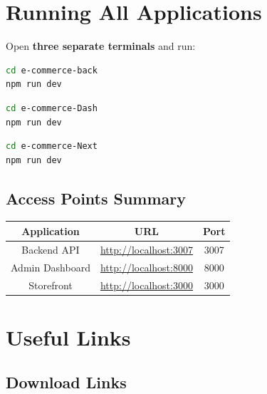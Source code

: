 \documentclass[12pt,a4paper]{article}
\begin{document}
\section{Running All Applications}

Open \textbf{three separate terminals} and run:

\begin{lstlisting}[language=bash, caption=Terminal 1 - Backend]
cd e-commerce-back
npm run dev
\end{lstlisting}

\begin{lstlisting}[language=bash, caption=Terminal 2 - Dashboard]
cd e-commerce-Dash
npm run dev
\end{lstlisting}

\begin{lstlisting}[language=bash, caption=Terminal 3 - Storefront]
cd e-commerce-Next
npm run dev
\end{lstlisting}

\subsection{Access Points Summary}

\begin{center}
\begin{tabular}{|c|c|c|}
\hline
\textbf{Application} & \textbf{URL} & \textbf{Port} \\
\hline
Backend API & \url{http://localhost:3007} & 3007 \\
Admin Dashboard & \url{http://localhost:8000} & 8000 \\
Storefront & \url{http://localhost:3000} & 3000 \\
\hline
\end{tabular}
\end{center}

\newpage

\section{Useful Links}

\subsection{Download Links}
\end{document}
